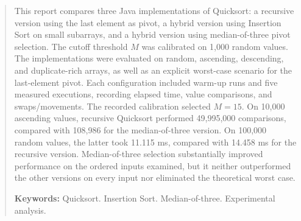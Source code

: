 \begin{abstract}
\vspace{-1cm}
\onehalfspacing
This report compares three Java implementations of Quicksort: a recursive version using the last element as pivot, a hybrid version using Insertion Sort on small subarrays, and a hybrid version using median-of-three pivot selection. The cutoff threshold $M$ was calibrated on 1,000 random values. The implementations were evaluated on random, ascending, descending, and duplicate-rich arrays, as well as an explicit worst-case scenario for the last-element pivot. Each configuration included warm-up runs and five measured executions, recording elapsed time, value comparisons, and swaps/movements. The recorded calibration selected $M=15$. On 10,000 ascending values, recursive Quicksort performed 49,995,000 comparisons, compared with 108,986 for the median-of-three version. On 100,000 random values, the latter took 11.115 ms, compared with 14.458 ms for the recursive version. Median-of-three selection substantially improved performance on the ordered inputs examined, but it neither outperformed the other versions on every input nor eliminated the theoretical worst case.
\par\vspace*{.75cm}
\noindent \textbf{Keywords:} Quicksort. Insertion Sort. Median-of-three. Experimental analysis.
\end{abstract}

